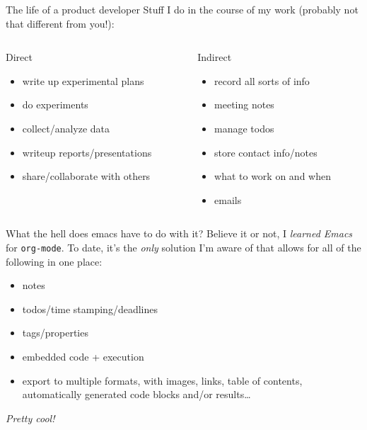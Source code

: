 \documentclass[aspectratio=169,presentation,bigger,fleqn,t]{beamer}
\begin{document}
\begin{frame}[label={sec:orgheadline3}]{The life of a product developer}
Stuff I do in the course of my work (probably not that different from you!):

\begin{columns}
\begin{column}{0.5\columnwidth}
\begin{block}{Direct}
\begin{itemize}
\item write up experimental plans
\item do experiments
\item collect/analyze data
\item writeup reports/presentations
\item share/collaborate with others
\end{itemize}
\end{block}
\end{column}

\begin{column}{0.5\columnwidth}
\begin{block}{Indirect}
\begin{itemize}
\item record all sorts of info
\item meeting notes
\item manage todos
\item store contact info/notes
\item what to work on and when
\item emails
\end{itemize}
\end{block}
\end{column}
\end{columns}
\end{frame}

\begin{frame}[fragile,label={sec:orgheadline4}]{What the hell does emacs have to do with it?}
 Believe it or not, I \emph{learned Emacs} for \texttt{org-mode}. To date, it's the \emph{only} solution I'm
aware of that allows for all of the following in one place:
\begin{itemize}
\item notes
\item todos/time stamping/deadlines
\item tags/properties
\item embedded code + execution
\item export to multiple formats, with images, links, table of contents, automatically
generated code blocks and/or results\ldots{}
\end{itemize}

\pause

\emph{Pretty cool!}
\end{frame}
\end{document}
